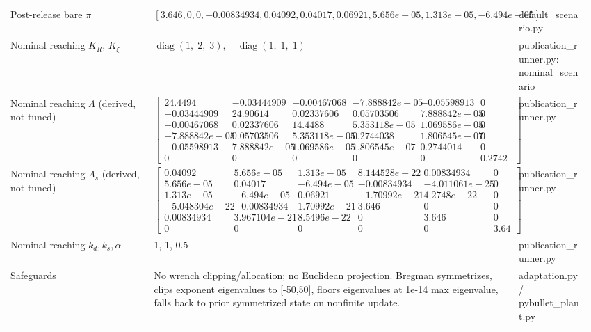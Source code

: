 \begin{table}[t]
\begin{tabular}{p{0.24\linewidth}p{0.61\linewidth}p{0.12\linewidth}}
Post-release bare $\pi$ & $[3.646, 0, 0, -0.00834934, 0.04092, 0.04017, 0.06921, 5.656e-05, 1.313e-05, -6.494e-05]$ & default_scenario.py \\
Nominal reaching $K_R$, $K_\xi$ & $\operatorname{diag}(1,\;2,\;3),\quad \operatorname{diag}(1,\;1,\;1)$ & publication_runner.py: nominal_scenario \\
Nominal reaching $\Lambda$ (derived, not tuned) & $\begin{bmatrix}24.4494 & -0.03444909 & -0.00467068 & -7.888842e-05 & -0.05598913 & 0 \\-0.03444909 & 24.90614 & 0.02337606 & 0.05703506 & 7.888842e-05 & 0 \\-0.00467068 & 0.02337606 & 14.4488 & 5.353118e-05 & 1.069586e-05 & 0 \\-7.888842e-05 & 0.05703506 & 5.353118e-05 & 0.2744038 & 1.806545e-07 & 0 \\-0.05598913 & 7.888842e-05 & 1.069586e-05 & 1.806545e-07 & 0.2744014 & 0 \\0 & 0 & 0 & 0 & 0 & 0.2742732\end{bmatrix}$ & publication_runner.py \\
Nominal reaching $\Lambda_s$ (derived, not tuned) & $\begin{bmatrix}0.04092 & 5.656e-05 & 1.313e-05 & 8.144528e-22 & 0.00834934 & 0 \\5.656e-05 & 0.04017 & -6.494e-05 & -0.00834934 & -4.011061e-25 & 0 \\1.313e-05 & -6.494e-05 & 0.06921 & -1.70992e-21 & 4.2748e-22 & 0 \\-5.048304e-22 & -0.00834934 & 1.70992e-21 & 3.646 & 0 & 0 \\0.00834934 & 3.967104e-21 & 8.5496e-22 & 0 & 3.646 & 0 \\0 & 0 & 0 & 0 & 0 & 3.646\end{bmatrix}$ & publication_runner.py \\
Nominal reaching $k_d,k_s,\alpha$ & 1, 1, 0.5 & publication_runner.py \\
Safeguards & No wrench clipping/allocation; no Euclidean projection. Bregman symmetrizes, clips exponent eigenvalues to [-50,50], floors eigenvalues at 1e-14 max eigenvalue, falls back to prior symmetrized state on nonfinite update. & adaptation.py / pybullet_plant.py \\
\hline\end{tabular}\end{table}
